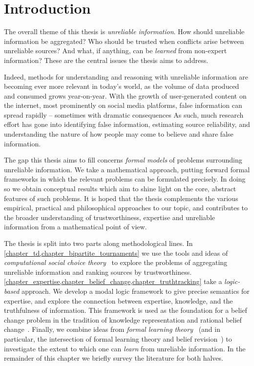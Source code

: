 \chapter{Introduction}

The overall theme of this thesis is \emph{unreliable information}. How should
unreliable information be aggregated? Who should be trusted when conflicts
arise between unreliable sources? And what, if anything, can be \emph{learned}
from non-expert information? These are the central issues the thesis aims to
address.

Indeed, methods for understanding and reasoning with unreliable information are
becoming ever more relevant in today's world, as the volume of data produced
and consumed grows year-on-year. With the growth of user-generated
content on the internet, most prominently on social media platforms, false
information can spread rapidly -- sometimes with dramatic
consequences As such, much research effort has gone into identifying
false information, estimating source reliability, and understanding the nature
of how people may come to believe and share false information.

The gap this thesis aims to fill concerns \emph{formal models} of problems
surrounding unreliable information. We take a mathematical approach, putting
forward formal frameworks in which the relevant problems can be formulated
precisely. In doing so we obtain conceptual results which aim to shine light on
the core, abstract features of such problems. It is hoped that the thesis
complements the various empirical, practical and philosophical approaches
to our topic, and contributes to the broader understanding of
trustworthiness, expertise and unreliable information from a mathematical point
of view.

The thesis is split into two parts along methodological lines. In
\cref{chapter_td,chapter_bipartite_tournaments} we use the tools and ideas of
\emph{computational social choice theory}~\cite{brandt2016introduction} to
explore the problems of aggregating unreliable information and ranking sources
by trustworthiness.
%
\cref{chapter_expertise,chapter_belief_change,chapter_truthtracking} take a
\emph{logic-based} approach. We develop a modal logic framework to give precise
semantics for expertise, and explore the connection between expertise,
knowledge, and the truthfulness of information. This framework is used as the
foundation for a belief change problem in the tradition of knowledge
representation and rational belief
change~\cite{booth_belief_2011,sep_belief_change,ferme_2018}. Finally, we
combine ideas from \emph{formal learning
theory}~\cites{jain1999systems}[]{gierasimczuk2010knowing}
(and in particular, the intersection of formal learning theory and belief
revision~\cite{baltag_tt_2019}) to investigate the extent to which one can
\emph{learn} from unreliable information.
%
In the remainder of this chapter we briefly survey the literature for both
halves.


